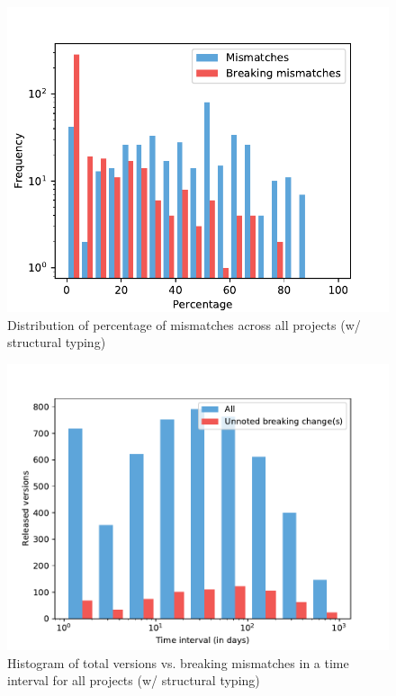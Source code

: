 \documentclass{l4proj}
\begin{document}
\begin{appendices}
\begin{figure}[]
\centering
\caption{Distribution of percentage of mismatches across all projects
(w/ structural typing)}
\label{StrDistributionAllProjects}
\includegraphics[height=0.4\textheight]{images/evaluation/str_distribution_mismatches_all_projects}
\end{figure}

\begin{figure}[]
\centering
\caption{Histogram of total versions vs. breaking mismatches in a time
interval for all projects (w/ structural typing)}
\label{StrHistogramAllProjects}
\includegraphics[height=0.4\textheight]{images/evaluation/ls_str_introduced_changes}
\end{figure}

\end{appendices}



\end{document}
